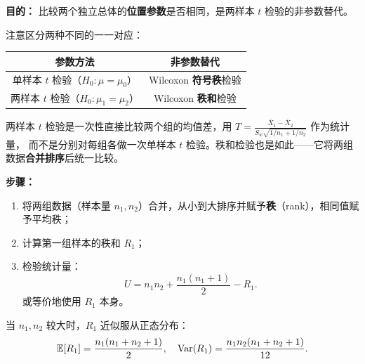 \textbf{目的：} 比较两个独立总体的\textbf{位置参数}是否相同，是两样本 $t$ 检验的非参数替代。

\begin{remark}[与 $t$ 检验的对应关系]
注意区分两种不同的一一对应：
\begin{center}
\begin{tabular}{c|c}
    \toprule
    参数方法 & 非参数替代 \\
    \midrule
    单样本 $t$ 检验（$H_0: \mu = \mu_0$） & Wilcoxon \textbf{符号秩}检验 \\
    两样本 $t$ 检验（$H_0: \mu_1 = \mu_2$） & Wilcoxon \textbf{秩和}检验 \\
    \bottomrule
\end{tabular}
\end{center}
两样本 $t$ 检验是一次性直接比较两个组的均值差，用 $T = \frac{\bar{X}_1 - \bar{X}_2}{S_w\sqrt{1/n_1 + 1/n_2}}$ 作为统计量，
而不是分别对每组各做一次单样本 $t$ 检验。秩和检验也是如此——它将两组数据\textbf{合并排序}后统一比较。
\end{remark}

\medskip
\textbf{步骤：}
\begin{enumerate}
    \item 将两组数据（样本量 $n_1, n_2$）合并，从小到大排序并赋予\textbf{秩}（rank），相同值赋予平均秩；
    \item 计算第一组样本的秩和 $R_1$；
    \item 检验统计量：
    \begin{equation}
        U = n_1 n_2 + \frac{n_1(n_1+1)}{2} - R_1.
    \end{equation}
    或等价地使用 $R_1$ 本身。
\end{enumerate}

当 $n_1, n_2$ 较大时，$R_1$ 近似服从正态分布：
\begin{equation}
    \mathbb{E}[R_1] = \frac{n_1(n_1+n_2+1)}{2},\quad
    \mathrm{Var}(R_1) = \frac{n_1 n_2 (n_1+n_2+1)}{12}.
\end{equation}

